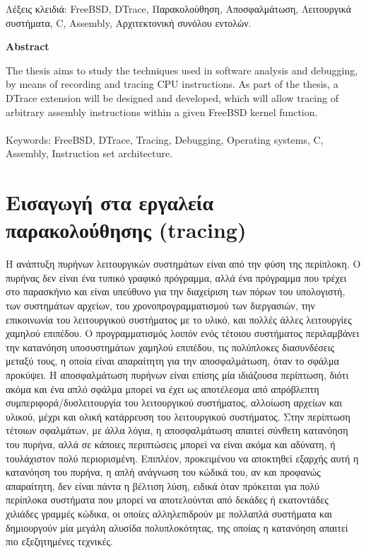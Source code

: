 \documentclass[12pt]{article}
\begin{document}
Λέξεις κλειδιά: FreeBSD, DTrace, Παρακολούθηση, Αποσφαλμάτωση, Λειτουργικά
συστήματα, C, Assembly, Αρχιτεκτονική συνόλου εντολών.

\begin{center}
\textbf{Abstract}
\end{center}

The thesis aims to study the techniques used in software analysis and
debugging, by means of recording and tracing CPU instructions. As part of the
thesis, a DTrace extension will be designed and developed, which will allow
tracing of arbitrary assembly instructions within a given FreeBSD kernel
function. \\ \\

Keywords: FreeBSD, DTrace, Tracing, Debugging, Operating systems, C, Assembly,
Instruction set architecture.

\pagebreak

\renewcommand{\contentsname}{Περιεχόμενα}
\tableofcontents
\pagebreak

\section{Εισαγωγή στα εργαλεία παρακολούθησης (tracing)}

Η ανάπτυξη πυρήνων λειτουργικών συστημάτων είναι από την φύση της περίπλοκη. Ο
πυρήνας δεν είναι ένα τυπικό γραφικό πρόγραμμα, αλλά ένα πρόγραμμα που τρέχει
στο παρασκήνιο και είναι υπεύθυνο για την διαχείριση των πόρων του υπολογιστή,
των συστημάτων αρχείων, του χρονοπρογραμματισμού των διεργασιών, την
επικοινωνία του λειτουργικού συστήματος με το υλικό, και πολλές άλλες
λειτουργίες χαμηλού επιπέδου. Ο προγραμματισμός λοιπόν ενός τέτοιου συστήματος
περιλαμβάνει την κατανόηση υποσυστημάτων χαμηλού επιπέδου, τις πολύπλοκες
διασυνδέσεις μεταξύ τους, η οποία είναι απαραίτητη για την αποσφαλμάτωση, όταν
το σφάλμα προκύψει. Η αποσφαλμάτωση πυρήνων είναι επίσης μία ιδιάζουσα
περίπτωση, διότι ακόμα και ένα απλό σφάλμα μπορεί να έχει ως αποτέλεσμα από
απρόβλεπτη συμπεριφορά/δυσλειτουργία του λειτουργικού συστήματος, αλλοίωση
αρχείων και υλικού, μέχρι και ολική κατάρρευση του λειτουργικού συστήματος.
Στην περίπτωση τέτοιων σφαλμάτων, με άλλα λόγια, η αποσφαλμάτωση απαιτεί
σύνθετη κατανόηση του πυρήνα, αλλά σε κάποιες περιπτώσεις μπορεί να είναι ακόμα
και αδύνατη, ή τουλάχιστον πολύ περιορισμένη. Επιπλέον, προκειμένου να
αποκτηθεί εξαρχής αυτή η κατανόηση του πυρήνα, η απλή ανάγνωση του κώδικά του, αν και
προφανώς απαραίτητη, δεν είναι πάντα η βέλτιση λύση, ειδικά όταν πρόκειται για
πολύ περίπλοκα συστήματα που μπορεί να αποτελούνται από δεκάδες ή εκατοντάδες
χιλιάδες γραμμές κώδικα, οι οποίες αλληλεπιδρούν με πολλαπλά συστήματα και
δημιουργούν μία μεγάλη αλυσίδα πολυπλοκότητας, της οποίας η κατανόηση απαιτεί
πιο εξεζητημένες τεχνικές.
\end{document}
